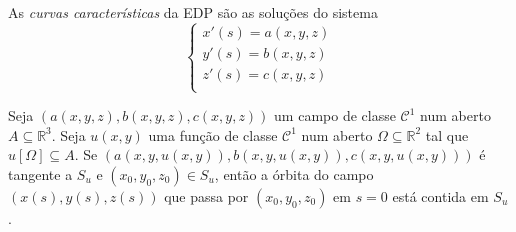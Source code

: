\documentclass[11pt,twoside,a4paper]{book}
\begin{document}
\begin{definicao}
As \emph{curvas características} da EDP são as soluções do sistema
\begin{equation*}
    \begin{cases}
    x'(s) = a(x,y,z) \\
    y'(s) = b(x,y,z) \\
    z'(s) = c(x,y,z) \\
    \end{cases}
\end{equation*}
\end{definicao}
\begin{teorema}
Seja $(a(x,y,z),b(x,y,z),c(x,y,z))$ um campo de classe $\mathcal{C}^1$ num aberto $A\subseteq\mathbb{R}^3$. Seja $u(x,y)$ uma função de classe $\mathcal{C}^1$ num aberto $\Omega\subseteq\mathbb{R}^2$ tal que $u[\Omega]\subseteq A$. Se $(a(x,y,u(x,y)),b(x,y,u(x,y)),c(x,y,u(x,y)))$ é tangente a $S_u$ e $(x_0,y_0,z_0)\in S_u$, então a órbita do campo $(x(s),y(s),z(s))$ que passa por $(x_0,y_0,z_0)$ em $s=0$ está contida em $S_u$.
\end{teorema}
\end{document}
